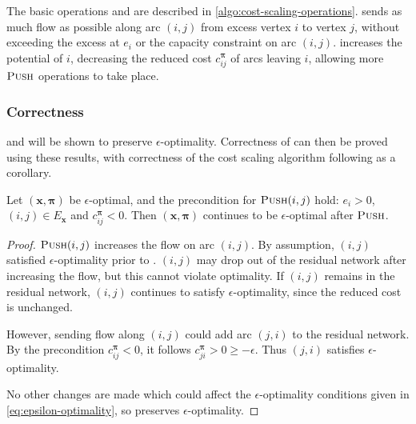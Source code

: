 The basic operations  and  are described in \cref{algo:cost-scaling-operations}.  sends as much flow as possible along arc $(i,j)$ from excess vertex $i$ to vertex $j$, without exceeding the excess at $e_i$ or the capacity constraint on arc $(i,j)$.  increases the potential of $i$, decreasing the reduced cost $c_{ij}^{\boldsymbol{\pi}}$ of arcs leaving $i$, allowing more $\textproc{Push}$ operations to take place.

\subsubsection{Correctness}

 and  will be shown to preserve $\epsilon$-optimality. Correctness of  can then be proved using these results, with correctness of the cost scaling algorithm following as a corollary.\\

\begin{lemma} \label{lemma:cost-scaling-push-correctness}
Let $\left(\mathbf{x},\boldsymbol{\pi}\right)$ be $\epsilon$-optimal, and the precondition for $\textproc{Push}(i,j)$ hold: $e_i > 0$, $(i,j) \in E_{\mathbf{x}}$ and $c^{\boldsymbol{\pi}}_{ij} < 0$. Then $\left(\mathbf{x},\boldsymbol{\pi}\right)$ continues to be $\epsilon$-optimal after $\textproc{Push}$.
\end{lemma}
\begin{proof}
$\textproc{Push}(i,j)$ increases the flow on arc $(i,j)$. By assumption, $(i,j)$ satisfied $\epsilon$-optimality prior to . $(i,j)$ may drop out of the residual network after increasing the flow, but this cannot violate optimality. If $(i,j)$ remains in the residual network, $(i,j)$ continues to satisfy $\epsilon$-optimality, since the reduced cost is unchanged.

However, sending flow along $(i,j)$ could add arc $(j,i)$ to the residual network. By the precondition $c^{\boldsymbol{\pi}}_{ij} < 0$, it follows $c^{\boldsymbol{\pi}}_{ji} > 0 \geq -\epsilon$. Thus $(j,i)$ satisfies $\epsilon$-optimality.

No other changes are made which could affect the $\epsilon$-optimality conditions given in \cref{eq:epsilon-optimality}, so  preserves $\epsilon$-optimality.
\end{proof}

